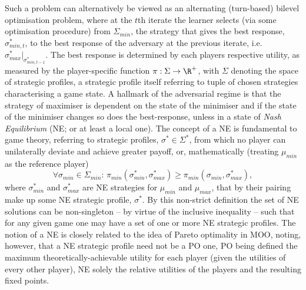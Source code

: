 Such a problem can alternatively be viewed as an alternating (turn-based) bilevel optimisation
problem, where at the \(t\)th iterate the learner selects (via some optimisation procedure) from \(
\Sigma_{min} \), the strategy that gives the best response, \(\sigma_{min, t}^{\ast}\), to the best
response of the adversary at the previous iterate, i.e. \( \sigma_{max}^\ast|_{\sigma_{min,t-1}^\ast} \).
%
%
The best response is determined by each players respective utility, as measured by the
player-specific function \(\pi: \Sigma \to \R^+\), with \(\Sigma\) denoting the space of strategic
profiles, a strategic profile itself referring to tuple of chosen strategies characterising a game
state.
%
A hallmark of the adversarial regime is that the strategy of maximiser is dependent on the
state of the minimiser and if the state of the minimiser changes so does the best-response, unless 
in a state of \emph{Nash Equilibrium} (NE; or at least a local one).  
%
%
The concept of a NE is fundamental to game theory, referring to strategic profiles, \(\sigma^\ast \in
\Sigma^\ast\), from which no player can unilaterally deviate and achieve greater payoff, or,
mathematically (treating \(\mu_{min}\) as the reference player)
%
\begin{equation}
  \forall \sigma_{min} \in \Sigma_{min}:\, \pi_{min} ( \sigma^\ast_{min}, \sigma^\ast_{max} ) \ge \pi_{min}(
  \sigma_{min}, \sigma^\ast_{max} ),
\end{equation}
%
where \(\sigma^\ast_{min}\) and \(\sigma^\ast_{max} \) are NE strategies for \(\mu_{min}\) and \( \mu_{max}
\), that by their pairing make up some NE strategic profile, \(\sigma^\ast\).
%
%
By this non-strict definition the set of NE solutions can be non-singleton -- by virtue of the
inclusive inequality -- such that for any given game one may have a set of one or more NE strategic
profiles.
%
The notion of a NE is closely related to the idea of Pareto optimality in MOO, noting, however,
that a NE strategic profile need not be a \ac{PO} one, \ac{PO} being defined \wrt{} the maximum
theoretically-achievable utility for each player (given the utilities of every other player), NE
solely \wrt{} the relative utilities of the players and the resulting fixed points.

